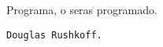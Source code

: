 \thispagestyle{empty}
\begin{flushright}
Programa, o seras programado.

\texttt{Douglas Rushkoff.}


\end{flushright}
